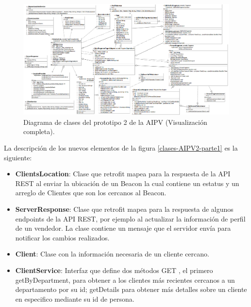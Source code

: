 \FloatBarrier
\begin{figure}[htbp!]
		\centering
			\includegraphics[width=.9 \textwidth]{imagenes/adrian/vendedor/prototipo2/clases}
		\caption{Diagrama de clases del prototipo 2 de la AIPV (Visualización completa).}
		\label{clases-AIPV2}
\end{figure}
\FloatBarrier

La descripción de los nuevos elementos de la figura \ref{clases-AIPV2-parte1} es la siguiente: 

\begin{itemize}
\item \textbf{ClientsLocation}: Clase que retrofit mapea para la respuesta de la API REST al enviar la ubicación de un Beacon la cual contiene un estatus y un arreglo de Clientes que son los cercanos al Beacon.
\item \textbf{ServerResponse}: Clase que retrofit mapea para la respuesta de algunos endpoints de la API REST, por ejemplo al actualizar la información de perfil de un vendedor. La clase contiene un mensaje que el servidor envía para notificar los cambios realizados.
\item \textbf{Client}: Clase con la información necesaria de un cliente cercano. 
\item \textbf{ClientService}: Interfaz que define dos métodos GET , el primero getByDepartment, para obtener a los clientes más recientes cercanos a un departamento por su id; getDetails para obtener más detalles sobre un cliente en especifico mediante su id de persona.
\end{itemize}

